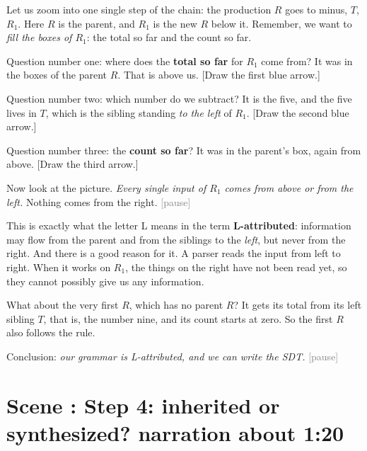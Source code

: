 \documentclass[11pt,a4paper]{article}
\newcommand{\pause}{\textcolor{gray}{\textsf{[pause]}}}
\newcounter{scene}
\newcommand{\scene}[2]{\stepcounter{scene}\needspace{20\baselineskip}\section*{Scene \thescene: #1 \hfill {\normalfont\small #2}}}
\begin{document}
\begin{narration}
Let us zoom into one single step of the chain: the production $R$ goes to minus, $T$, $R_1$. Here $R$ is the parent, and $R_1$ is the new $R$ below it. Remember, we want to \emph{fill the boxes of $R_1$}: the total so far and the count so far.

Question number one: where does the \textbf{total so far} for $R_1$ come from? It was in the boxes of the parent $R$. That is above us. [Draw the first blue arrow.]

Question number two: which number do we subtract? It is the five, and the five lives in $T$, which is the sibling standing \emph{to the left} of $R_1$. [Draw the second blue arrow.]

Question number three: the \textbf{count so far}? It was in the parent's box, again from above. [Draw the third arrow.]

Now look at the picture. \emph{Every single input of $R_1$ comes from above or from the left.} Nothing comes from the right. \pause

This is exactly what the letter L means in the term \textbf{L-attributed}: information may flow from the parent and from the siblings to the \emph{left}, but never from the right. And there is a good reason for it. A parser reads the input from left to right. When it works on $R_1$, the things on the right have not been read yet, so they cannot possibly give us any information.

What about the very first $R$, which has no parent $R$? It gets its total from its left sibling $T$, that is, the number nine, and its count starts at zero. So the first $R$ also follows the rule.

Conclusion: \emph{our grammar is L-attributed, and we can write the SDT.} \pause
\end{narration}

\scene{Step 4: inherited or synthesized?}{narration about 1:20}
\end{document}
